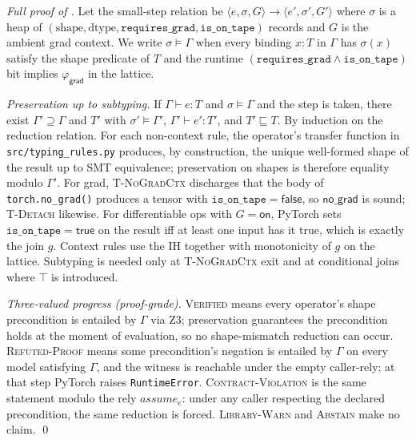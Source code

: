 \begin{proof}[Full proof of ]
Let the small-step relation be
$\langle e,\sigma,G\rangle\to\langle e',\sigma',G'\rangle$
where $\sigma$ is a heap of
$(\mathrm{shape},\mathrm{dtype},\mathtt{requires\_grad},
\mathtt{is\_on\_tape})$ records and $G$ is the ambient grad
context. We write $\sigma\models\Gamma$ when every binding
$x:T$ in $\Gamma$ has $\sigma(x)$ satisfy the shape predicate
of $T$ and the runtime
$(\mathtt{requires\_grad}\wedge\mathtt{is\_on\_tape})$ bit
implies $\varphi_{\mathsf{grad}}$ in the lattice.

\emph{Preservation up to subtyping.} If $\Gamma\vdash e:T$ and
$\sigma\models\Gamma$ and the step is taken, there exist
$\Gamma'\supseteq\Gamma$ and $T'$ with
$\sigma'\models\Gamma'$, $\Gamma'\vdash e':T'$, and
$T'\sqsubseteq T$. By induction on the reduction relation. For
each non-context rule, the operator's transfer function in
\texttt{src/typing\_rules.py} produces, by construction, the
unique well-formed shape of the result up to SMT equivalence;
preservation on shapes is therefore equality modulo $\Gamma'$.
For grad, \textsc{T-NoGradCtx} discharges that the body of
\texttt{torch.no\_grad()} produces a tensor with
$\mathtt{is\_on\_tape}=\mathsf{false}$, so $\mathsf{no\_grad}$
is sound; \textsc{T-Detach} likewise. For differentiable ops
with $G=\mathsf{on}$, PyTorch sets
$\mathtt{is\_on\_tape}=\mathsf{true}$ on the result iff at
least one input has it true, which is exactly the join $g$.
Context rules use the IH together with monotonicity of $g$ on
the lattice. Subtyping is needed only at \textsc{T-NoGradCtx}
exit and at conditional joins where $\top$ is introduced.

\emph{Three-valued progress (proof-grade).} \textsc{Verified}
means every operator's shape precondition is entailed by
$\Gamma$ via Z3; preservation guarantees the precondition holds
at the moment of evaluation, so no shape-mismatch reduction can
occur. \textsc{Refuted-Proof} means some precondition's
negation is entailed by $\Gamma$ on every model satisfying
$\Gamma$, and the witness is reachable under the empty
caller-rely; at that step PyTorch raises
\texttt{RuntimeError}. \textsc{Contract-Violation} is the same
statement modulo the rely $\mathit{assume}_e$: under any caller
respecting the declared precondition, the same reduction is
forced. \textsc{Library-Warn} and \textsc{Abstain} make no
claim. \qed
\end{proof}



